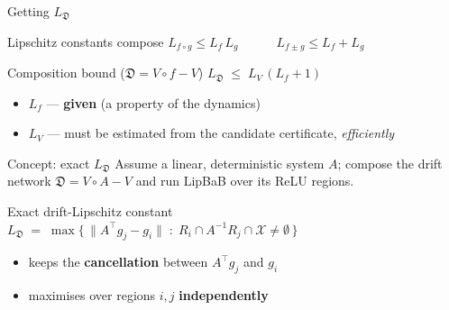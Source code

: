 \documentclass{beamer}
\newcommand{\cert}{V}                      %
\newcommand{\drift}{\mathfrak{D}}          %
\newcommand{\aX}{\mathcal{X}}              %
\begin{document}
\appendix

\begin{frame}{Getting $L_\drift$}
  \begin{block}{Lipschitz constants compose}\centering
    $L_{f\circ g} \le L_f\,L_g \qquad\quad L_{f\pm g} \le L_f + L_g$
  \end{block}
  \begin{block}{Composition bound \quad($\drift = \cert\circ f - \cert$)}\centering
    $L_\drift \;\le\; L_\cert\,(L_f + 1)$
  \end{block}
  \begin{itemize}
    \item $L_f$ --- \textbf{given} (a property of the dynamics)
    \item $L_\cert$ --- must be estimated from the candidate certificate, \emph{efficiently}
  \end{itemize}
\end{frame}

\begin{frame}{Concept: exact $L_\drift$}
  Assume a linear, deterministic system $A$; compose the drift network
  $\drift = \cert\circ A - \cert$ and run LipBaB over its ReLU regions.
  \begin{block}{Exact drift-Lipschitz constant}\centering
    $L_\drift \;=\; \max\big\{\,\lVert A^{\top} g_j - g_i\rVert \;:\; R_i \cap A^{-1}R_j \cap \aX \neq \emptyset \,\big\}$
  \end{block}
  \begin{itemize}\small
    \item keeps the \textbf{cancellation} between $A^{\top}g_j$ and $g_i$
    \item maximises over regions $i,j$ \textbf{independently}
  \end{itemize}
\end{frame}
\end{document}
